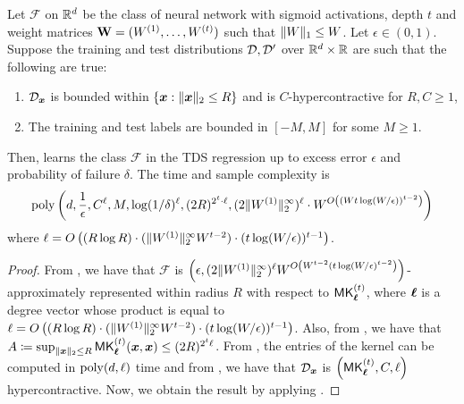 \begin{theorem}
\label{thm:tds_learning_sigmoid_appendix}
Let $\mathcal{F}$ on $\mathbb{R}^{d}$ be the class of  neural network with sigmoid activations, depth $t$ and weight matrices $\mathbf{W}=(W^{(1)},\ldots,W^{(t)})$ such that $\|W\|_1\leq W$.  Let $\epsilon\in (0,1)$. Suppose the training and test distributions ${\mathcal{D}},{\mathcal{D}}'$ over $\mathbb{R}^{d}\times \mathbb{R}$ are such that the following are true:
\begin{enumerate}
    \item ${\mathcal{D}}_{{\bm{x}}}$ is bounded within $\{{\bm{x}}:\|{\bm{x}}\|_{2}\leq R\}$ and is $C$-hypercontractive for $R,C\geq 1$,
    \item The training and test labels are bounded in $[-M,M]$ for some $M\geq 1$.
\end{enumerate}
Then,  learns the class $\mathcal{F}$ in the TDS regression up to excess error $\epsilon$ and probability of failure $\delta$. The time and sample complexity is \[\mathrm{poly}\left(d,\frac{1}{\epsilon},C^{\ell}, M,\log(1/\delta)^{\ell},(2R)^{2^t\cdot \ell},(2\|W^{(1)}\|_{2}^{\infty})^{\ell}\cdot W^{O\left((Wt\log(W/\epsilon))^{t-2}\right)}\right)\] where $\ell=O\left((R\log R)\cdot (\|W^{(1)}\|_{2}^{\infty}W^{t-2})\cdot (t\log(W/\epsilon))^{t-1}\right)$.
\end{theorem}
\begin{proof}
From , we have that $\mathcal{F}$ is $\left( \epsilon, (2\|W^{(1)}\|_{2}^{\infty})^{\ell} W^{O\left(W^{t-2}(t\log(W/\epsilon)^{t-2}\right)} \right)$-approximately represented within radius $R$ with respect to $\mathsf{MK}_{\boldsymbol{\ell}}^{(t)}$, where $\boldsymbol{\ell}$ is a degree vector whose product is equal to $\ell=O\left((R\log R)\cdot (\|W^{(1)}\|_{2}^{\infty}W^{t-2})\cdot (t\log(W/\epsilon))^{t-1}\right)$. Also, from , we have that $A\coloneq \sup_{\|{\bm{x}}\|_{2}\leq R}\mathsf{MK}_{\boldsymbol{\ell}}^{(t)}({\bm{x}},{\bm{x}})\leq (2R)^{2^t\ell}$. From , the entries of the kernel can be computed in $\mathrm{poly}(d,\ell)$ time and from , we have that ${\mathcal{D}}_{{\bm{x}}}$ is $\left(\mathsf{MK}_{\boldsymbol{\ell}}^{(t)},C,\ell\right)$ hypercontractive. Now, we obtain the result by applying .
\end{proof}

